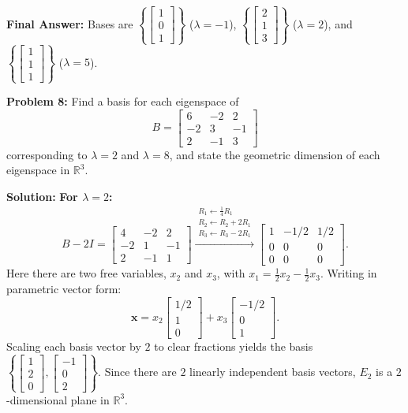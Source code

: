 \documentclass[11pt, letterpaper]{article}
\theoremstyle{definition}
\theoremstyle{remark}
\begin{document}
\textbf{Final Answer:} Bases are $\left\{ \begin{bmatrix} 1 \\ 0 \\ 1 \end{bmatrix} \right\}$ ($\lambda = -1$), $\left\{ \begin{bmatrix} 2 \\ 1 \\ 3 \end{bmatrix} \right\}$ ($\lambda = 2$), and $\left\{ \begin{bmatrix} 1 \\ 1 \\ 1 \end{bmatrix} \right\}$ ($\lambda = 5$).

\vspace{0.4em}
\textbf{Problem 8:}
Find a basis for each eigenspace of
\[
B = \begin{bmatrix} 6 & -2 & 2 \\ -2 & 3 & -1 \\ 2 & -1 & 3 \end{bmatrix}
\]
corresponding to $\lambda = 2$ and $\lambda = 8$, and state the geometric dimension of each eigenspace in $\mathbb{R}^3$.

\textbf{Solution:}
\textbf{For $\lambda = 2$:}
\[
B - 2I = \begin{bmatrix} 4 & -2 & 2 \\ -2 & 1 & -1 \\ 2 & -1 & 1 \end{bmatrix}
\xrightarrow{\substack{R_1 \leftarrow \frac{1}{4}R_1 \\ R_2 \leftarrow R_2 + 2R_1 \\ R_3 \leftarrow R_3 - 2R_1}}
\begin{bmatrix} 1 & -1/2 & 1/2 \\ 0 & 0 & 0 \\ 0 & 0 & 0 \end{bmatrix}.
\]
Here there are two free variables, $x_2$ and $x_3$, with $x_1 = \frac{1}{2}x_2 - \frac{1}{2}x_3$. Writing in parametric vector form:
\[
\mathbf{x} = x_2 \begin{bmatrix} 1/2 \\ 1 \\ 0 \end{bmatrix} + x_3 \begin{bmatrix} -1/2 \\ 0 \\ 1 \end{bmatrix}.
\]
Scaling each basis vector by $2$ to clear fractions yields the basis $\left\{ \begin{bmatrix} 1 \\ 2 \\ 0 \end{bmatrix}, \begin{bmatrix} -1 \\ 0 \\ 2 \end{bmatrix} \right\}$. Since there are $2$ linearly independent basis vectors, $E_2$ is a $2$-dimensional plane in $\mathbb{R}^3$.
\end{document}
